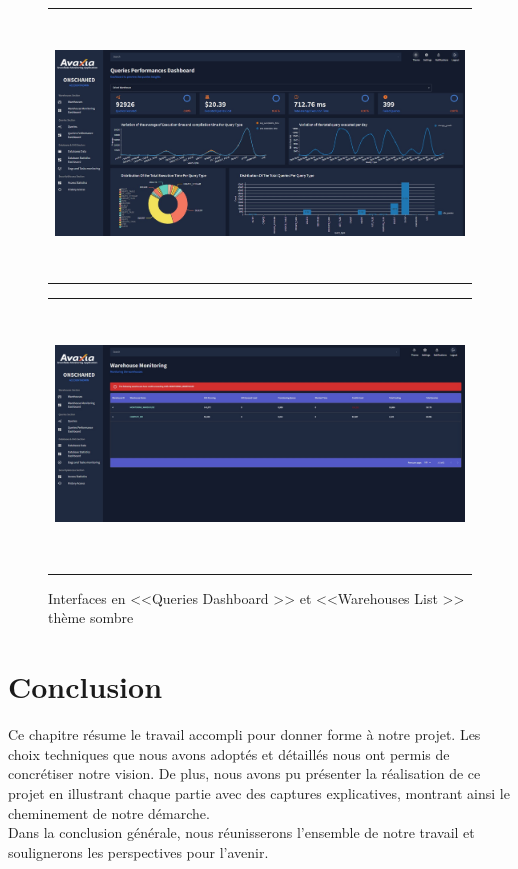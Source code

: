  \begin{figure}[H]
    \centering
    \begin{tabular}[b]{c}
        \includegraphics[width=1\linewidth ,height=7cm]{img/captures/dark/1.jpg}
        \end{tabular}
        \begin{tabular}[b]{c}
            \includegraphics[width=1\linewidth,height=7cm]{img/captures/dark/3.jpg}
            \end{tabular}
            \caption{Interfaces en <<Queries Dashboard >> et <<Warehouses List >> thème sombre}
            \label{fig:dark2}
\end{figure}


\section*{Conclusion}
Ce chapitre résume le travail accompli pour donner forme à notre projet. Les choix techniques que nous avons adoptés et 
détaillés nous ont permis de concrétiser notre vision. De plus, nous avons pu présenter la réalisation de ce projet en
 illustrant chaque partie avec des captures explicatives, montrant ainsi le cheminement de notre démarche. 
\\Dans la conclusion générale, nous réunisserons l'ensemble de notre travail et soulignerons les perspectives pour l'avenir. 